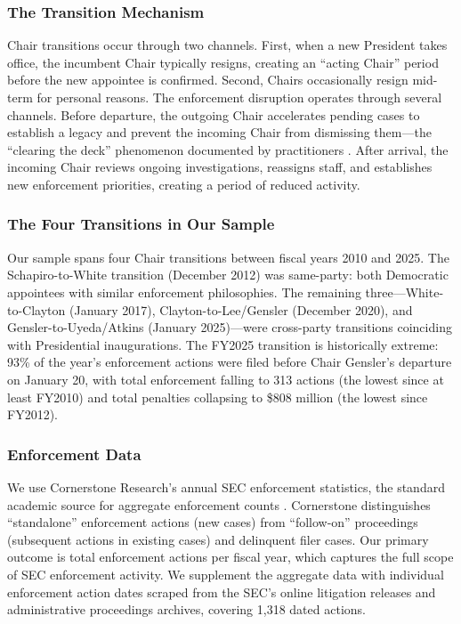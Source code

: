 \documentclass[12pt]{article}
\begin{document}
\subsubsection*{The Transition Mechanism} Chair transitions occur through two channels. First, when a new President takes office, the incumbent Chair typically resigns, creating an ``acting Chair'' period before the new appointee is confirmed. Second, Chairs occasionally resign mid-term for personal reasons. The enforcement disruption operates through several channels. Before departure, the outgoing Chair accelerates pending cases to establish a legacy and prevent the incoming Chair from dismissing them---the ``clearing the deck'' phenomenon documented by practitioners \citep{jackson2007policing}. After arrival, the incoming Chair reviews ongoing investigations, reassigns staff, and establishes new enforcement priorities, creating a period of reduced activity.

\subsubsection*{The Four Transitions in Our Sample} Our sample spans four Chair transitions between fiscal years 2010 and 2025. The Schapiro-to-White transition (December 2012) was same-party: both Democratic appointees with similar enforcement philosophies. The remaining three---White-to-Clayton (January 2017), Clayton-to-Lee/Gensler (December 2020), and Gensler-to-Uyeda/Atkins (January 2025)---were cross-party transitions coinciding with Presidential inaugurations. The FY2025 transition is historically extreme: 93\% of the year's enforcement actions were filed before Chair Gensler's departure on January 20, with total enforcement falling to 313 actions (the lowest since at least FY2010) and total penalties collapsing to \$808 million (the lowest since FY2012).

\subsubsection*{Enforcement Data} We use Cornerstone Research's annual SEC enforcement statistics, the standard academic source for aggregate enforcement counts \citep{urska2012securities}. Cornerstone distinguishes ``standalone'' enforcement actions (new cases) from ``follow-on'' proceedings (subsequent actions in existing cases) and delinquent filer cases. Our primary outcome is total enforcement actions per fiscal year, which captures the full scope of SEC enforcement activity. We supplement the aggregate data with individual enforcement action dates scraped from the SEC's online litigation releases and administrative proceedings archives, covering 1,318 dated actions.
\end{document}
